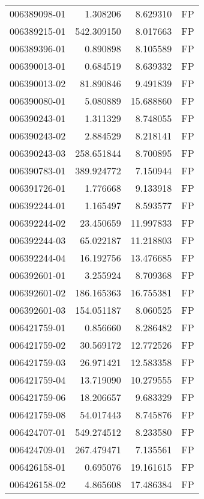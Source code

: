 \begin{tabular}{lrrl}
006389098-01 &    1.308206 &       8.629310 &   FP \\
006389215-01 &  542.309150 &       8.017663 &   FP \\
006389396-01 &    0.890898 &       8.105589 &   FP \\
006390013-01 &    0.684519 &       8.639332 &   FP \\
006390013-02 &   81.890846 &       9.491839 &   FP \\
006390080-01 &    5.080889 &      15.688860 &   FP \\
006390243-01 &    1.311329 &       8.748055 &   FP \\
006390243-02 &    2.884529 &       8.218141 &   FP \\
006390243-03 &  258.651844 &       8.700895 &   FP \\
006390783-01 &  389.924772 &       7.150944 &   FP \\
006391726-01 &    1.776668 &       9.133918 &   FP \\
006392244-01 &    1.165497 &       8.593577 &   FP \\
006392244-02 &   23.450659 &      11.997833 &   FP \\
006392244-03 &   65.022187 &      11.218803 &   FP \\
006392244-04 &   16.192756 &      13.476685 &   FP \\
006392601-01 &    3.255924 &       8.709368 &   FP \\
006392601-02 &  186.165363 &      16.755381 &   FP \\
006392601-03 &  154.051187 &       8.060525 &   FP \\
006421759-01 &    0.856660 &       8.286482 &   FP \\
006421759-02 &   30.569172 &      12.772526 &   FP \\
006421759-03 &   26.971421 &      12.583358 &   FP \\
006421759-04 &   13.719090 &      10.279555 &   FP \\
006421759-06 &   18.206657 &       9.683329 &   FP \\
006421759-08 &   54.017443 &       8.745876 &   FP \\
006424707-01 &  549.274512 &       8.233580 &   FP \\
006424709-01 &  267.479471 &       7.135561 &   FP \\
006426158-01 &    0.695076 &      19.161615 &   FP \\
006426158-02 &    4.865608 &      17.486384 &   FP \\

\end{tabular}
